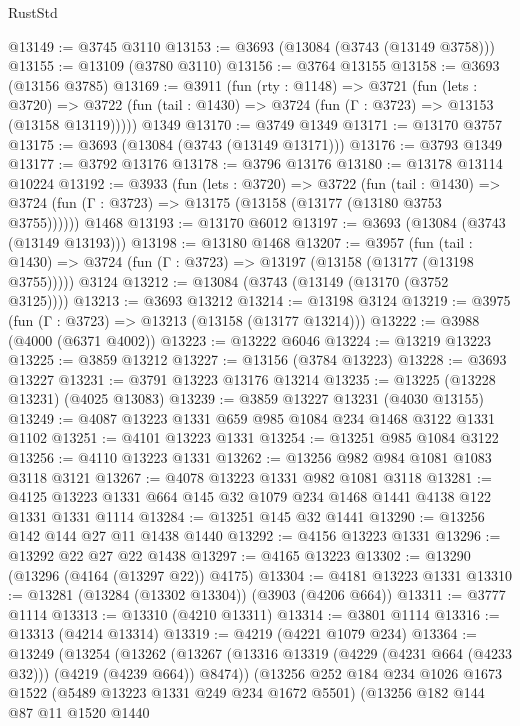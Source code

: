 \begin{lexlean}{RustStd}
\begin{coremodule}
@13149 := @3745 @3110
@13153 := @3693 (@13084 (@3743 (@13149 @3758)))
@13155 := @13109 (@3780 @3110)
@13156 := @3764 @13155
@13158 := @3693 (@13156 @3785)
@13169 := @3911
    (fun (rty : @1148) =>
    @3721
      (fun (lets : @3720) =>
      @3722 (fun (tail : @1430) => @3724 (fun (Γ : @3723) => @13153 (@13158 @13119)))))
    @1349
@13170 := @3749 @1349
@13171 := @13170 @3757
@13175 := @3693 (@13084 (@3743 (@13149 @13171)))
@13176 := @3793 @1349
@13177 := @3792 @13176
@13178 := @3796 @13176
@13180 := @13178 @13114 @10224
@13192 := @3933
    (fun (lets : @3720) =>
    @3722
      (fun (tail : @1430) =>
      @3724 (fun (Γ : @3723) => @13175 (@13158 (@13177 (@13180 @3753 @3755))))))
    @1468
@13193 := @13170 @6012
@13197 := @3693 (@13084 (@3743 (@13149 @13193)))
@13198 := @13180 @1468
@13207 := @3957
    (fun (tail : @1430) => @3724 (fun (Γ : @3723) => @13197 (@13158 (@13177 (@13198 @3755)))))
    @3124
@13212 := @13084 (@3743 (@13149 (@13170 (@3752 @3125))))
@13213 := @3693 @13212
@13214 := @13198 @3124
@13219 := @3975 (fun (Γ : @3723) => @13213 (@13158 (@13177 @13214)))
@13222 := @3988 (@4000 (@6371 @4002))
@13223 := @13222 @6046
@13224 := @13219 @13223
@13225 := @3859 @13212
@13227 := @13156 (@3784 @13223)
@13228 := @3693 @13227
@13231 := @3791 @13223 @13176 @13214
@13235 := @13225 (@13228 @13231) (@4025 @13083)
@13239 := @3859 @13227 @13231 (@4030 @13155)
@13249 := @4087 @13223 @1331 @659 @985 @1084 @234 @1468 @3122 @1331 @1102
@13251 := @4101 @13223 @1331
@13254 := @13251 @985 @1084 @3122
@13256 := @4110 @13223 @1331
@13262 := @13256 @982 @984 @1081 @1083 @3118 @3121
@13267 := @4078 @13223 @1331 @982 @1081 @3118
@13281 := @4125 @13223 @1331 @664 @145 @32 @1079 @234 @1468 @1441 @4138 @122 @1331 @1331 @1114
@13284 := @13251 @145 @32 @1441
@13290 := @13256 @142 @144 @27 @11 @1438 @1440
@13292 := @4156 @13223 @1331
@13296 := @13292 @22 @27 @22 @1438
@13297 := @4165 @13223
@13302 := @13290 (@13296 (@4164 (@13297 @22)) @4175)
@13304 := @4181 @13223 @1331
@13310 := @13281 (@13284 (@13302 @13304)) (@3903 (@4206 @664))
@13311 := @3777 @1114
@13313 := @13310 (@4210 @13311)
@13314 := @3801 @1114
@13316 := @13313 (@4214 @13314)
@13319 := @4219 (@4221 @1079 @234)
@13364 := @13249
    (@13254
      (@13262
        (@13267 (@13316 @13319 (@4229 (@4231 @664 (@4233 @32))) (@4219 (@4239 @664)) @8474))
        (@13256
          @252
          @184
          @234
          @1026
          @1673
          @1522
          (@5489 @13223 @1331 @249 @234 @1672 @5501)
          (@13256
            @182
            @144
            @87
            @11
            @1520
            @1440

\end{coremodule}
\end{lexlean}

